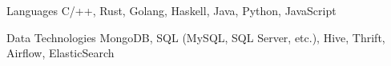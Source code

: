 


\begin{cvskills}


  \cvskill
  {Languages} %
  {C/++, Rust, Golang, Haskell, Java, Python, JavaScript} %

  \cvskill
  {Data Technologies}
  {MongoDB, SQL (MySQL, SQL Server, etc.), Hive, Thrift, Airflow, ElasticSearch} %
  
\end{cvskills}
